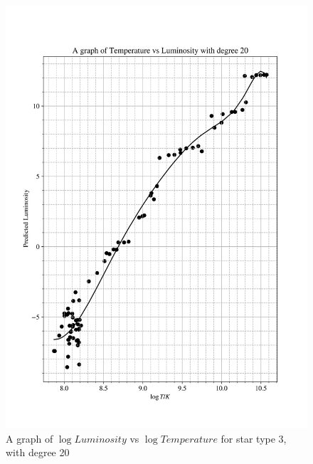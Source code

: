 \documentclass[12pt, a4paper]{article}
\begin{document}
\begin{figure}[H]
    \centering
    \includegraphics[width = \textwidth]{2Plot4_20.png}
    \caption{A graph of \(\log{Luminosity}\) vs \(\log{Temperature}\) for star type 3, with degree 20}
    \label{fig:Fig 2.9}
\end{figure}
\end{document}
